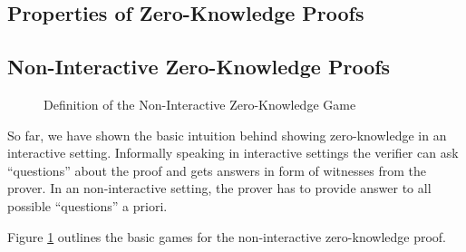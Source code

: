\subsection{Properties of Zero-Knowledge Proofs}

\subsection{Non-Interactive Zero-Knowledge Proofs}
\begin{figure}
\centering


\caption{Definition of the Non-Interactive Zero-Knowledge Game}
    \label{fig:nizk}
\end{figure}

So far, we have shown the basic intuition behind showing zero-knowledge in an interactive setting.
Informally speaking in interactive settings the verifier can ask ``questions'' about the proof and gets answers in form of witnesses from the prover.
In an non-interactive setting, the prover has to provide answer to all possible ``questions'' a priori.

Figure \ref{fig:nizk} outlines the basic games for the non-interactive zero-knowledge proof.



